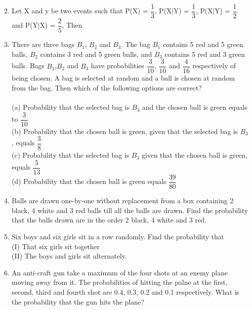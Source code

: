 \documentclass[journal,12pt,twocolumn]{IEEEtran}
\begin{document}
\begin{enumerate}[label=\arabic*]
\begin{multicols}{4}
    \end{multicols}
    \item Let X and y be two events such that P(X) = $\dfrac{1}{3}$, P(X$|$Y) = $\dfrac{1}{3}$, P(X$|$Y) = $\dfrac{1}{2}$ and P(Y$|$X) = $\dfrac{2}{5}$, Then
    \begin{itemize}
    \end{itemize}
    \item There are three bags $B_1$, $B_2$ and $B_3$. The bag $B_1$ contains 5 red and 5 green balls, $B_2$ contains 3 red and 5 green balls, and $B_3$ contains 5 red and 3 green balls. Bags $B_1$,$B_2$ and $B_3$ have probabilities  $\dfrac{3}{10}$, $\dfrac{3}{10}$ and $\dfrac{4}{16}$ respectively of being chosen. A bag is selected at random and a ball is chosen at random from the bag. Then which of the following options are correct?\\
    \\
    (a) Probability that the selected bag is $B_3$ and the chosen ball is green equals to $\dfrac{3}{10}$\\
    (b) Probability that the chosen ball is green, given that the selected bag is $B_3$, equals $\dfrac{3}{8}$\\
	(c) Probability that the selected bag is $B_3$ given that the chosen ball is green, equals $\dfrac{5}{13}$\\
	(d) Probability that the chosen ball is green equals $\dfrac{39}{80}$\\
	\item Balls are drawn one-by-one without replacement from a box containing 2 black, 4 white and 3 red balls till all the balls are drawn. Find the probability that the balls drawn are in the order 2 black, 4 white and 3 red.\\
	\item Six boys and six girls sit in a row randomly. Find the probability that\\
	(I) That six girls sit together\\
	(II) The boys and girls sit alternately.\\
	\item An anti-craft gun take a maximum of the four shots at an enemy plane moving away from it. The probabilities of hitting the palne at the first, second, third and fourth shot are 0.4, 0.3, 0.2 and 0.1 respectively. What is the probability that the gun hits the plane?\\

\end{enumerate}
\end{document}
